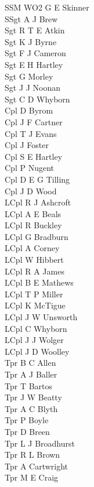 \begin{multicols}{4}
  \scriptsize
  \noindent
  SSM WO2 G E Skinner \\
  SSgt A J Brew \\
  Sgt R T E Atkin \\
  Sgt K J Byrne \\
  Sgt F J Cameron \\
  Sgt E H Hartley \\
  Sgt G Morley \\
  Sgt J J Noonan \\
  Sgt C D Whyborn \\
  Cpl D Byrom \\
  Cpl J F Cartner \\
  Cpl T J Evans \\
  Cpl J Foster \\
  Cpl S E Hartley \\
  Cpl P Nugent \\
  Cpl D E G Tilling \\
  Cpl J D Wood \\
  LCpl R J Ashcroft \\
  LCpl A E Beals \\
  LCpl R Buckley \\
  LCpl G Bradburn \\
  LCpl A Corney \\
  LCpl W Hibbert \\
  LCpl R A James \\
  LCpl B E Mathews \\
  LCpl T P Miller \\
  LCpl K McTigue \\
  LCpl J W Unsworth \\
  LCpl C Whyborn \\
  LCpl J J Wolger \\
  LCpl J D Woolley \\
  Tpr B C Allen \\
  Tpr A J Baller \\
  Tpr T Bartos \\
  Tpr J W Beatty \\
  Tpr A C Blyth \\
  Tpr P Boyle \\
  Tpr D Breen \\
  Tpr L J Broadhurst \\
  Tpr R L Brown \\
  Tpr A Cartwright \\
  Tpr M E Craig \\

\end{multicols}
